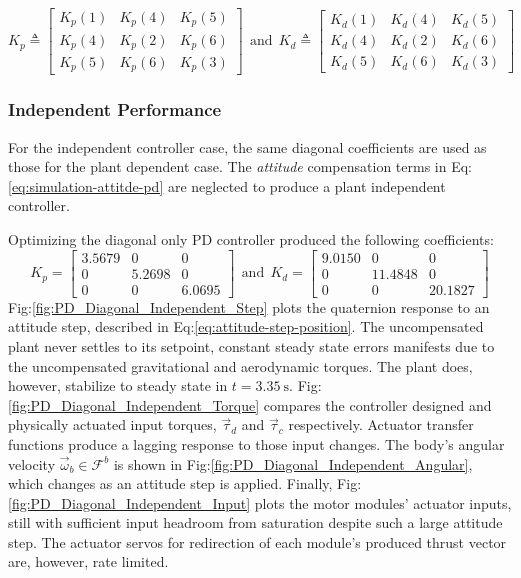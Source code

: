\begin{equation}\label{eq:simulation-attitde-pd-symmetric-coefficients}
K_p\triangleq \begin{bmatrix}
K_p(1) & K_p(4) & K_p(5)\\
K_p(4) & K_p(2) & K_p(6)\\
K_p(5) & K_p(6) & K_p(3)
\end{bmatrix}
~~\text{and}~~K_d\triangleq \begin{bmatrix}
K_d(1) & K_d(4) & K_d(5)\\
K_d(4) & K_d(2) & K_d(6)\\
K_d(5) & K_d(6) & K_d(3)
\end{bmatrix}
\end{equation}
\subsubsection{Independent Performance}
\label{subsubsec:simulation.atttiude.pd.independent}
For the independent controller case, the same diagonal coefficients are used as those for the plant dependent case. The \emph{attitude} compensation terms in Eq:\ref{eq:simulation-attitde-pd} are neglected to produce a plant independent controller. 
\par
Optimizing the diagonal only PD controller produced the following coefficients:
\begin{equation}\label{eq:optimized-pd-independent}
K_p = \begin{bmatrix}
3.5679 & 0 & 0\\
0 & 5.2698 & 0\\
0 & 0 & 6.0695
\end{bmatrix}
~~\text{and}~~K_d = \begin{bmatrix}
9.0150 & 0 & 0\\
0 & 11.4848 & 0\\
0 & 0 & 20.1827
\end{bmatrix}
\end{equation}
Fig:\ref{fig:PD_Diagonal_Independent_Step} plots the quaternion response to an attitude step, described in Eq:\ref{eq:attitude-step-position}. The uncompensated plant never settles to its setpoint, constant steady state errors manifests due to the uncompensated gravitational and aerodynamic torques. The plant does, however, stabilize to steady state in $t = 3.35~\text{s}$. Fig:\ref{fig:PD_Diagonal_Independent_Torque} compares the controller designed and physically actuated input torques, $\vec{\tau}_d$ and $\vec{\tau}_c$ respectively. Actuator transfer functions produce a lagging response to those input changes. The body's angular velocity $\vec{\omega}_b\in\mathcal{F}^{b}$ is shown in Fig:\ref{fig:PD_Diagonal_Independent_Angular}, which changes as an attitude step is applied. Finally, Fig:\ref{fig:PD_Diagonal_Independent_Input} plots the motor modules' actuator inputs, still with sufficient input headroom from saturation despite such a large attitude step. The actuator servos for redirection of each module's produced thrust vector are, however, rate limited.

